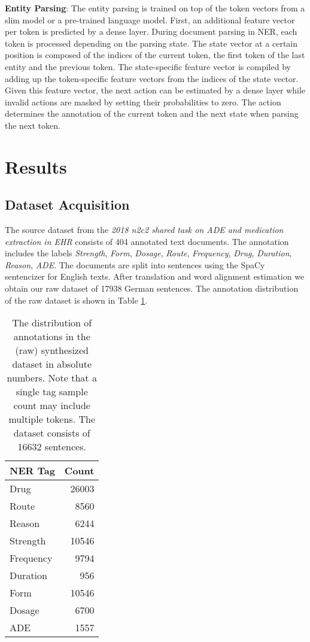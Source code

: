 \documentclass[runningheads]{llncs}
\begin{document}
\textbf{Entity Parsing}: The entity parsing is trained on top of the token vectors from a slim model or a pre-trained language model. First, an additional feature vector per token is predicted by a dense layer. During document parsing in NER, each token is processed depending on the parsing state. The state vector at a certain position is composed of the indices of the current token, the first token of the last entity and the previous token. The state-specific feature vector is compiled by adding up the token-specific feature vectors from the indices of the state vector. Given this feature vector, the next action can be estimated by a dense layer while invalid actions are masked by setting their probabilities to zero. The action determines the annotation of the current token and the next state when parsing the next token.

\section{Results}
\subsection{Dataset Acquisition}
The source dataset from the \textit{2018 n2c2 shared task on ADE and medication extraction in EHR} consists of 404 annotated text documents. The annotation includes the labels \textit{Strength}, \textit{Form}, \textit{Dosage}, \textit{Route}, \textit{Frequency}, \textit{Drug}, \textit{Duration}, \textit{Reason}, \textit{ADE}. The documents are split into sentences using the SpaCy sentencizer for English texts. After translation and word alignment estimation we obtain our raw dataset of 17938 German sentences. The annotation distribution of the raw dataset is shown in Table \ref{tab:rawdataset}.
\begin{table}[!ht]
    \centering
    \begin{tabular}{l|r}
        \hline
        \textbf{NER Tag} & \textbf{Count} \\
        \hline
        \hline
        Drug         & 26003       \\
        Route        & 8560        \\
        Reason       & 6244        \\
        Strength     & 10546       \\
        Frequency    & 9794        \\
        Duration     & 956         \\
        Form         & 10546       \\
        Dosage       & 6700        \\
        ADE          & 1557        \\
        \hline
    \end{tabular}
    \caption{The distribution of annotations in the (raw) synthesized dataset in absolute numbers. Note that a single tag sample count may include multiple tokens. The dataset consists of 16632 sentences.}
    \label{tab:rawdataset}
\end{table}
\end{document}
